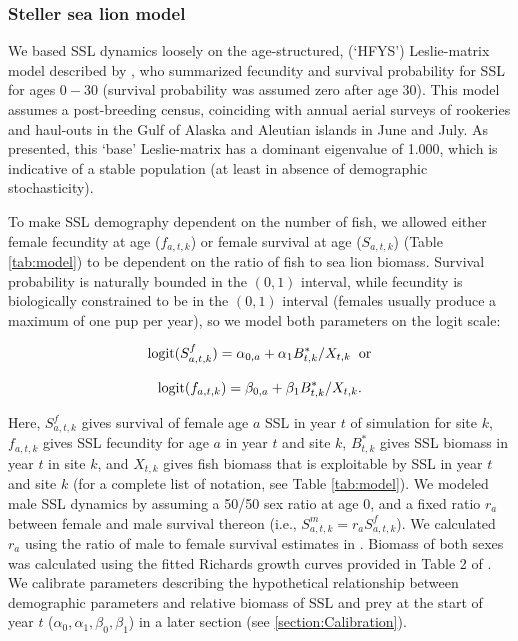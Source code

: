 \documentclass[11pt]{article}
\begin{document}
\subsubsection{Steller sea lion model}

We based SSL dynamics loosely on the age-structured, (`HFYS') Leslie-matrix model described by \citet{HolmesEtAl2007}, who summarized fecundity and survival probability for SSL for ages $0-30$ (survival probability was assumed zero after age 30).  This model assumes a post-breeding census, coinciding with annual aerial surveys of rookeries and haul-outs in the Gulf of Alaska and Aleutian islands in June and July.  As presented, this `base' Leslie-matrix has a dominant eigenvalue of 1.000, which is indicative of a stable population (at least in absence of demographic stochasticity).

To make SSL demography dependent on the number of fish, we allowed either female fecundity at age ($f_{a,t,k}$) or female survival at age ($S_{a,t,k}$) (Table \ref{tab:model}) to be dependent on the ratio of fish to sea lion biomass.  Survival probability is naturally bounded in the $(0,1)$ interval, while
fecundity is biologically constrained to be in the $(0,1)$ interval (females usually produce a maximum of one pup per year), so we model both parameters on the logit scale:
\begin{linenomath}
\begin{equation*}
{\rm logit}(S^f_{a,t,k})=\alpha_{0,a} + \alpha_1 B_{t,k}^*/X_{t,k} \hspace{2mm} {\rm or}
\end{equation*}
\end{linenomath}
\begin{linenomath}
\begin{equation*}
{\rm logit}(f_{a,t,k})=\beta_{0,a} + \beta_1 B_{t,k}^*/X_{t,k}.
\end{equation*}
\end{linenomath}
Here, $S^f_{a,t,k}$ gives survival of female age $a$ SSL in year $t$ of simulation for site $k$, $f_{a,t,k}$ gives SSL fecundity for age $a$ in year $t$ and site $k$, $B_{t,k}^*$ gives SSL biomass in year $t$ in site $k$, and $X_{t,k}$ gives fish biomass that is exploitable by SSL in year $t$ and site $k$ (for a complete list of notation, see Table \ref{tab:model}).  We modeled male SSL dynamics by assuming a 50/50 sex ratio at age 0, and a fixed ratio $r_a$ between female and male survival thereon (i.e., $S^m_{a,t,k}=r_a S^f_{a,t,k}$).  We calculated $r_a$ using the ratio of male to female survival estimates in \citet{CalkinsPitcher1982}. Biomass of both sexes was calculated using the fitted Richards growth curves provided in Table 2 of \citet{WinshipEtAl2001}. We calibrate parameters describing the hypothetical relationship between demographic parameters and relative biomass of SSL and prey at the start of year $t$ ($\alpha_0,\alpha_1,\beta_0,\beta_1$) in a later section (see \ref{section:Calibration}).
\end{document}
